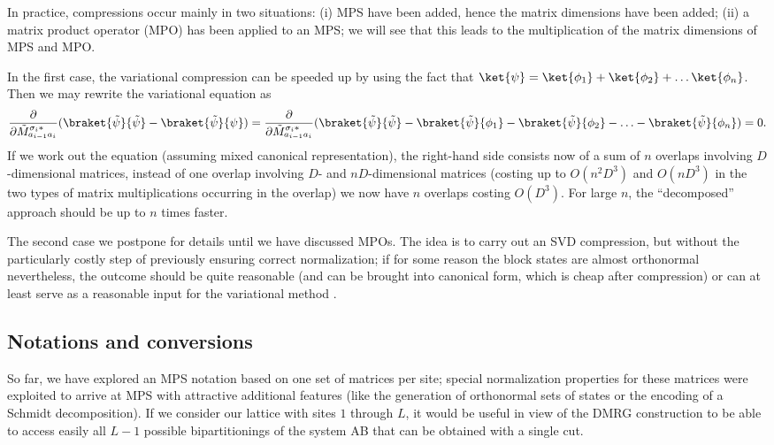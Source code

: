 In practice, compressions occur mainly in two situations: (i) MPS have been added, hence the matrix dimensions have been added; (ii) a matrix product operator (MPO) has been applied to an MPS; we will see that this leads to the multiplication of the matrix dimensions of MPS and MPO.

In the first case, the variational compression can be speeded up by using the fact that $\ket{\psi} = \ket{\phi_1} + \ket{\phi_2} + \ldots \ket{\phi_n}$. Then we may rewrite the variational equation as
\begin{equation}
 \frac{\partial}{\partial \tilde{M}^{\sigma_i*}_{a_{i-1}a_i}} ( \braket{\tilde{\psi}}{\tilde{\psi}}
- \braket{\tilde{\psi}}{\psi} ) =  \frac{\partial}{\partial \tilde{M}^{\sigma_i*}_{a_{i-1}a_i}} ( \braket{\tilde{\psi}}{\tilde{\psi}} - \braket{\tilde{\psi}}{\phi_1}
- \braket{\tilde{\psi}}{\phi_2} - \ldots - \braket{\tilde{\psi}}{\phi_n}) = 0 .
\end{equation}
If we work out the equation (assuming mixed canonical representation), the right-hand side consists now of a sum of $n$ overlaps involving $D$-dimensional matrices, instead of one overlap involving $D$- and $nD$-dimensional matrices (costing up to $O(n^2D^3)$ and $O(nD^3)$ in the two types of matrix multiplications occurring in the overlap) we now have $n$ overlaps costing $O(D^3)$. For large $n$, the ``decomposed'' approach should be up to $n$ times faster.

The second case we postpone for details until we have discussed MPOs. The idea is to carry out an SVD compression, but without the particularly costly step of previously ensuring correct normalization; if for some reason the block states are almost orthonormal nevertheless, the outcome should be quite reasonable (and can be brought into canonical form, which is cheap after compression) or can at least serve as a reasonable input for the variational method \cite{Stoudenmire10}.

\subsection{Notations and conversions}
So far, we have explored an MPS notation based on one set of matrices per site; special normalization properties for these matrices were exploited to arrive at MPS with attractive additional features (like the generation of orthonormal sets of states or the encoding of a Schmidt decomposition). If we consider our lattice with sites $1$ through $L$, it would be useful in view of the DMRG construction to be able to access easily all $L-1$ possible bipartitionings of the system AB that can be obtained with a single cut. 

